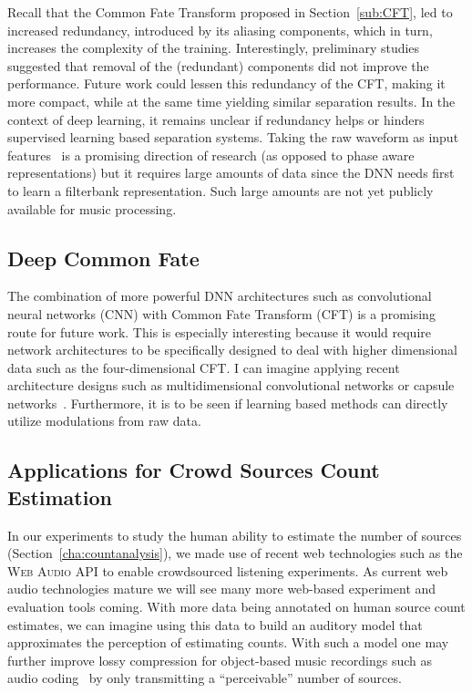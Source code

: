 Recall that the Common Fate Transform proposed in Section~\ref{sub:CFT}, led to increased redundancy, introduced by its aliasing components, which in turn, increases the complexity of the training.
Interestingly, preliminary studies suggested that removal of the (redundant) components did not improve the performance.
Future work could lessen this redundancy of the CFT, making it more compact, while at the same time yielding similar separation results.
In the context of deep learning, it remains unclear if redundancy helps or hinders supervised learning based separation systems.
Taking the raw waveform as input features~\cite{Dieleman14, oord16} is a promising direction of research (as opposed to phase aware representations) but it requires large amounts of data since the DNN needs first to learn a filterbank representation.
Such large amounts are not yet publicly available for music processing.

\subsection*{Deep Common Fate}

The combination of more powerful DNN architectures such as convolutional neural networks (CNN) with Common Fate Transform (CFT) is a promising route for future work.
This is especially interesting because it would require network architectures to be specifically designed to deal with higher dimensional data such as the four-dimensional CFT. I can imagine applying recent architecture designs such as multidimensional convolutional networks or capsule networks~\cite{sabour17}.
Furthermore, it is to be seen if learning based methods can directly utilize modulations from raw data.

\subsection*{Applications for Crowd Sources Count Estimation}

In our experiments to study the human ability to estimate the number of sources (Section~\ref{cha:countanalysis}), we made use of recent web technologies such as the \textsc{Web Audio API} to enable crowdsourced listening experiments. As current web audio technologies mature we will see many more web-based experiment and evaluation tools coming.
With more data being annotated on human source count estimates, we can imagine using this data to build an auditory model that approximates the perception of estimating counts.
With such a model one may further improve lossy compression for object-based music recordings such as audio coding~\cite{herre12} by only transmitting a ``perceivable'' number of sources.

